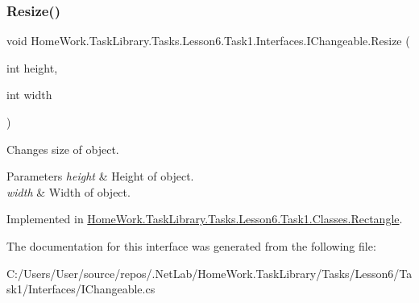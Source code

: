 \subsubsection{\texorpdfstring{Resize()}{Resize()}}
{\footnotesize\ttfamily void Home\+Work.\+Task\+Library.\+Tasks.\+Lesson6.\+Task1.\+Interfaces.\+I\+Changeable.\+Resize (\begin{DoxyParamCaption}\item[{int}]{height,  }\item[{int}]{width }\end{DoxyParamCaption})}



Changes size of object. 


\begin{DoxyParams}{Parameters}
{\em height} & Height of object.\\
\hline
{\em width} & Width of object.\\
\hline
\end{DoxyParams}


Implemented in \mbox{\hyperlink{class_home_work_1_1_task_library_1_1_tasks_1_1_lesson6_1_1_task1_1_1_classes_1_1_rectangle_a84e67739744220cb808f5c679cd7bde0}{Home\+Work.\+Task\+Library.\+Tasks.\+Lesson6.\+Task1.\+Classes.\+Rectangle}}.



The documentation for this interface was generated from the following file\+:\begin{DoxyCompactItemize}
\item 
C\+:/\+Users/\+User/source/repos/.\+Net\+Lab/\+Home\+Work.\+Task\+Library/\+Tasks/\+Lesson6/\+Task1/\+Interfaces/I\+Changeable.\+cs\end{DoxyCompactItemize}
